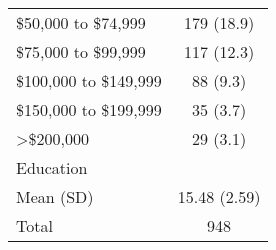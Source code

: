 \documentclass[12pt]{article}
\begin{document}
\begin{table}[]
\begin{tabular}{@{}lc@{}}
\hspace*{0.5em}\$50,000 to \$74,999      & 179 (18.9)    \\
\hspace*{0.5em}\$75,000 to \$99,999      & 117 (12.3)    \\
\hspace*{0.5em}\$100,000 to \$149,999    & 88 (9.3)      \\
\hspace*{0.5em}\$150,000 to \$199,999    & 35 (3.7)      \\
\hspace*{0.5em}\textgreater{}\$200,000 & 29 (3.1)      \\
Education               &               \\
\hspace*{0.5em}Mean (SD)               & 15.48 (2.59)  \\ \midrule
Total                   & 948           \\ \bottomrule
\end{tabular}
\end{table}
\end{document}
